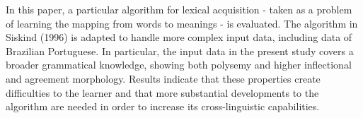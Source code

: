 In this paper, a particular algorithm for lexical acquisition - taken as a problem of learning the mapping from words to meanings - is evaluated. The algorithm in Siskind (1996) is adapted to handle more complex input data, including data of Brazilian Portuguese. In particular, the input data in the present study covers a broader grammatical knowledge, showing both polysemy and higher inflectional and agreement morphology. Results indicate that these properties create difficulties to the learner and that more substantial developments to the algorithm are needed in order to increase its cross-linguistic capabilities.

